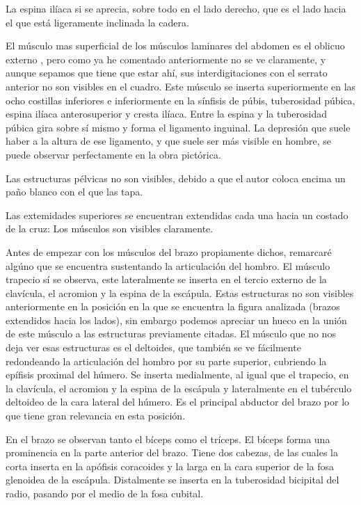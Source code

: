 La espina ilíaca si se aprecia, sobre todo en el lado derecho, que es el lado hacia el que está ligeramente inclinada la cadera.

El músculo mas superficial de los músculos laminares del abdomen es el oblicuo externo , pero como ya he comentado anteriormente no se ve claramente, y aunque sepamos que tiene que estar ahí, sus interdigitaciones con el serrato anterior no son visibles en el cuadro. Este músculo se inserta superiormente en las ocho costillas inferiores e inferiormente en la sínfisis de púbis, tuberosidad púbica, espina ilíaca anterosuperior y cresta ilíaca. Entre la espina y la tuberosidad púbica gira sobre sí mismo y forma el ligamento inguinal. La depresión que suele haber a la altura de ese ligamento, y que suele ser más visible en hombre, se puede observar perfectamente en la obra pictórica.

\vspace{12pt}

Las estructuras pélvicas no son visibles, debido a que el autor coloca encima un paño blanco con el que las tapa.

\vspace{12pt}

Las extemidades superiores se encuentran extendidas cada una hacia un costado de la cruz: Los músculos son visibles claramente.

Antes de empezar con los músculos del brazo propiamente dichos, remarcaré algúno que se encuentra sustentando la articulación del hombro. El músculo trapecio sí se observa, este lateralmente se inserta en el tercio externo de la clavícula, el acromion y la espina de la escápula. Estas estructuras no son visibles anteriormente en la posición en la que se encuentra la figura analizada (brazos extendidos hacia los lados), sin embargo podemos apreciar un hueco en la unión de este músculo a las estructuras previamente citadas. El músculo que no nos deja ver esas estructuras es el deltoides, que también se ve fácilmente redondeando la articulación del hombro por su parte superior, cubriendo la epífisis proximal del húmero. Se inserta medialmente, al igual que el trapecio, en la clavícula, el acromion y la espina de la escápula y lateralmente en el tubérculo deltoideo de la cara lateral del húmero. Es el principal abductor del brazo por lo que tiene gran relevancia en esta posición.

En el brazo se observan tanto el bíceps como el tríceps. El bíceps forma una prominencia en la parte anterior del brazo. Tiene dos cabezas, de las cuales la corta inserta en la apófisis coracoides y la larga en la cara superior de la fosa glenoidea de la escápula. Distalmente se inserta en la tuberosidad bicipital del radio, pasando por el medio de la fosa cubital.

